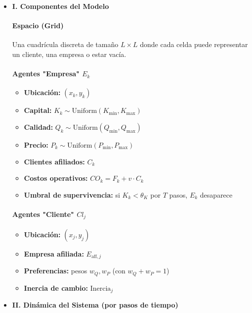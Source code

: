 \documentclass[a4paper,12pt]{article}
\begin{document}
\begin{itemize}
    \item \textbf{I. Componentes del Modelo}

    \paragraph{Espacio (Grid)} Una cuadrícula discreta de tamaño $L \times L$ donde cada celda puede representar un cliente, una empresa o estar vacía.

    \paragraph{Agentes "Empresa" $E_k$}
    \begin{itemize}
        \item \textbf{Ubicación:} $(x_k, y_k)$
        \item \textbf{Capital:} $K_k \sim \text{Uniform}(K_{\text{min}}, K_{\text{max}})$
        \item \textbf{Calidad:} $Q_k \sim \text{Uniform}(Q_{\text{min}}, Q_{\text{max}})$
        \item \textbf{Precio:} $P_k \sim \text{Uniform}(P_{\text{min}}, P_{\text{max}})$
        \item \textbf{Clientes afiliados:} $C_k$
        \item \textbf{Costos operativos:} $CO_k = F_k + v \cdot C_k$
        \item \textbf{Umbral de supervivencia:} si $K_k < \theta_K$ por $T$ pasos, $E_k$ desaparece
    \end{itemize}

    \paragraph{Agentes "Cliente" $Cl_j$}
    \begin{itemize}
        \item \textbf{Ubicación:} $(x_j, y_j)$
        \item \textbf{Empresa afiliada:} $E_{\text{aff},j}$
        \item \textbf{Preferencias:} pesos $w_Q, w_P$ (con $w_Q + w_P = 1$)
        \item \textbf{Inercia de cambio:} $\text{Inercia}_j$
    \end{itemize}

    \item \textbf{II. Dinámica del Sistema (por pasos de tiempo)}


\end{itemize}
\end{document}
